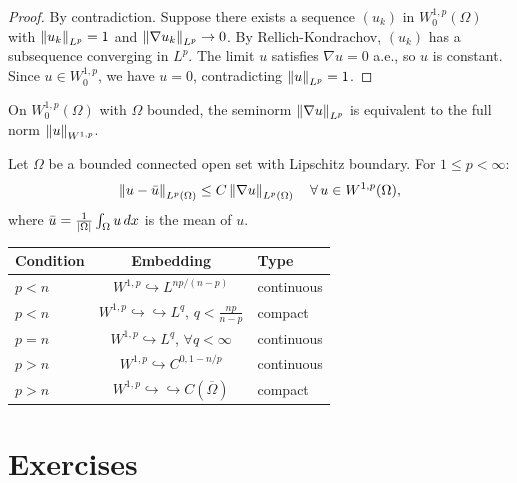 \begin{proof}
By contradiction. Suppose there exists a sequence $(u_k)$ in $W_0^{1,p}(\Omega)$
with $\left\| u_k \right\|_{L^p} = 1$ and $\left\| \nabla u_k \right\|_{L^p} \to 0$. By
Rellich-Kondrachov, $(u_k)$ has a subsequence converging in $L^p$. The limit $u$
satisfies $\nabla u = 0$ a.e., so $u$ is constant. Since $u \in W_0^{1,p}$, we
have $u = 0$, contradicting $\left\| u \right\|_{L^p} = 1$.
\end{proof}

\begin{corollary}
On $W_0^{1,p}(\Omega)$ with $\Omega$ bounded, the seminorm $\left\| \nabla u \right\|_{L^p}$
is equivalent to the full norm $\left\| u \right\|_{W^{1,p}}$.
\end{corollary}

\begin{theorem}
Let $\Omega$ be a bounded connected open set with Lipschitz boundary. For
$1 \leq p < \infty$:
\[
    \left\| u - \bar{u} \right\|_{L^p(\Omega)} \leq C \left\| \nabla u \right\|_{L^p(\Omega)}
    \quad \forall\, u \in W^{1,p}(\Omega),
\]
where $\bar{u} = \frac{1}{\left| \Omega \right|} \int_\Omega u\, dx$ is the mean of $u$.
\end{theorem}

\begin{keyformulas}[title=\textbf{Summary of Sobolev embeddings ($k=1$)}]
\begin{center}
\renewcommand{\arraystretch}{1.3}
\begin{tabular}{lcl}
\textbf{Condition} & \textbf{Embedding} & \textbf{Type} \\
\hline
$p < n$ & $W^{1,p} \hookrightarrow L^{np/(n-p)}$ & continuous \\
$p < n$ & $W^{1,p} \hookrightarrow\hookrightarrow L^{q}$, $q < \frac{np}{n-p}$ & compact \\
$p = n$ & $W^{1,p} \hookrightarrow L^q$, $\forall q < \infty$ & continuous \\
$p > n$ & $W^{1,p} \hookrightarrow C^{0,1-n/p}$ & continuous \\
$p > n$ & $W^{1,p} \hookrightarrow\hookrightarrow C(\overline{\Omega})$ & compact \\
\end{tabular}
\end{center}
\end{keyformulas}

\section{Exercises}

